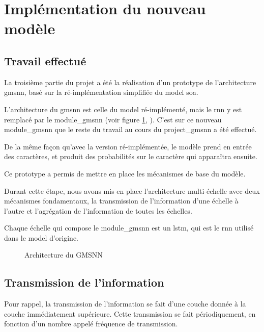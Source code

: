 \section{Implémentation du nouveau modèle}
\subsection{Travail effectué}\label{def:lstm_2}
La troisième partie du projet a été la réalisation d'un prototype de l'architecture \gls{gmsnn}, basé sur la ré-implémentation simplifiée du \gls{model} \gls{soa}.

L'architecture du \gls{gmsnn} est celle du \gls{model} ré-implémenté, mais le \gls{rnn} y est remplacé par le \gls{module_gmsnn} (voir figure \ref{fig:reimplement_gmsnn}, ). C'est sur ce nouveau \gls{module_gmsnn} que le reste du travail au cours du \gls{project_gmsnn} a été effectué.

De la même façon qu'avec la version ré-implémentée, le modèle prend en entrée des caractères, et produit des probabilités sur le caractère qui apparaîtra ensuite.

Ce prototype a permis de mettre en place les mécanismes de base du modèle.

Durant cette étape, nous avons mis en place l'architecture multi-échelle avec deux mécanismes fondamentaux, la transmission de l'information d'une échelle à l'autre et l'agrégation de l'information de toutes les échelles.

Chaque échelle qui compose le \gls{module_gmsnn} est un \gls{lstm}, qui est le \gls{rnn} utilisé dans le \gls{model} d'origine.

\begin{figure}[ht]
	\centering
	\scalebox{1}{}
	\caption[Architecture du  GMSNN]{Architecture du  GMSNN}\label{fig:reimplement_gmsnn}
\end{figure} 

\pagebreak
\subsection{Transmission de l'information}
Pour rappel, la transmission de l'information se fait d'une couche donnée à la couche immédiatement supérieure.
Cette transmission se fait périodiquement, en fonction d'un nombre appelé fréquence de transmission.


